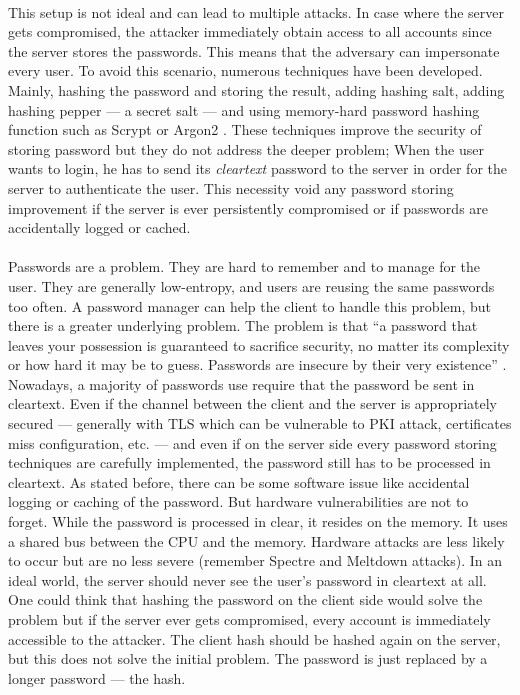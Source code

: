 ﻿\documentclass[../report.tex]{subfiles}
\begin{document}
\paragraph{}
This setup is not ideal and can lead to multiple attacks.
In case where the server gets compromised, the attacker immediately obtain access to all accounts since the server stores the passwords. This means that the adversary can impersonate every user.
To avoid this scenario, numerous techniques have been developed.
Mainly, hashing the password and storing the result, adding hashing salt, adding hashing pepper --- a secret salt --- and using memory-hard password hashing function such as Scrypt \cite{Scrypt_Paper} or Argon2 \cite{Argon2_Paper}.
These techniques improve the security of storing password but they do not address the deeper problem;
When the user wants to login, he has to send its \emph{cleartext} password to the server in order for the server to authenticate the user. This necessity void any password storing improvement if the server is ever persistently compromised or if passwords are accidentally logged or cached.


\paragraph{}
Passwords are a problem. They are hard to remember and to manage for the user. They are generally low-entropy, and users are reusing the same passwords too often. A password manager can help the client to handle this problem, but there is a greater underlying problem.
The problem is that ``a password that leaves your possession is guaranteed to sacrifice security, no matter its complexity or how hard it may be to guess. Passwords are insecure by their very existence'' \cite{PAKE_Cloudflare_blog}. %
Nowadays, a majority of passwords use require that the password be sent in cleartext.
Even if the channel between the client and the server is appropriately secured
--- generally with TLS which can be vulnerable to PKI attack, certificates miss configuration, etc. ---
and even if on the server side every password storing techniques are carefully implemented, the password still has to be processed in cleartext.
As stated before, there can be some software issue like accidental logging or caching of the password. But hardware vulnerabilities are not to forget. While the password is processed in clear, it resides on the memory. It uses a shared bus between the CPU and the memory. Hardware attacks are less likely to occur but are no less severe (remember Spectre \cite{Spectre_Paper} and Meltdown \cite{Meltdown_Paper} attacks).
In an ideal world, the server should never see the user's password in cleartext at all.
One could think that hashing the password on the client side would solve the problem but if the server ever gets compromised, every account is immediately accessible to the attacker. The client hash should be hashed again on the server, but this does not solve the initial problem. The password is just replaced by a longer password --- the hash.
\end{document}

